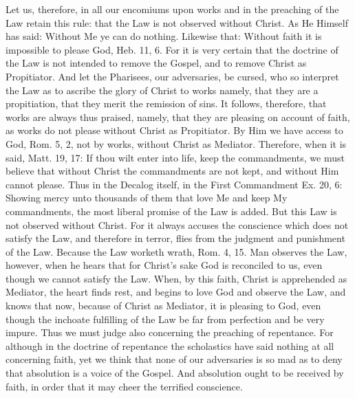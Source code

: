 Let us, therefore, in all our encomiums upon works and in the
preaching of the Law retain this rule: that the Law is not observed
without Christ.  As He Himself has said: Without Me ye can do nothing.
Likewise that: Without faith it is impossible to please God, Heb.
11, 6. For it is very certain that the doctrine of the Law is not
intended to remove the Gospel, and to remove Christ as Propitiator.
And let the Pharisees, our adversaries, be cursed, who so interpret
the Law as to ascribe the glory of Christ to works namely, that they
are a propitiation, that they merit the remission of sins.  It
follows, therefore, that works are always thus praised, namely, that
they are pleasing on account of faith, as works do not please without
Christ as Propitiator.  By Him we have access to God, Rom. 5, 2, not
by works, without Christ as Mediator.  Therefore, when it is said,
Matt. 19, 17: If thou wilt enter into life, keep the commandments, we
must believe that without Christ the commandments are not kept, and
without Him cannot please.  Thus in the Decalog itself, in the First
Commandment Ex. 20, 6: Showing mercy unto thousands of them that love
Me and keep My commandments, the most liberal promise of the Law is
added.  But this Law is not observed without Christ.  For it always
accuses the conscience which does not satisfy the Law, and therefore
in terror, flies from the judgment and punishment of the Law.
Because the Law worketh wrath, Rom. 4, 15. Man observes the Law,
however, when he hears that for Christ's sake God is reconciled to us,
even though we cannot satisfy the Law.  When, by this faith, Christ
is apprehended as Mediator, the heart finds rest, and begins to love
God and observe the Law, and knows that now, because of Christ as
Mediator, it is pleasing to God, even though the inchoate fulfilling
of the Law be far from perfection and be very impure.  Thus we must
judge also concerning the preaching of repentance.  For although in
the doctrine of repentance the scholastics have said nothing at all
concerning faith, yet we think that none of our adversaries is so mad
as to deny that absolution is a voice of the Gospel.  And absolution
ought to be received by faith, in order that it may cheer the
terrified conscience.

